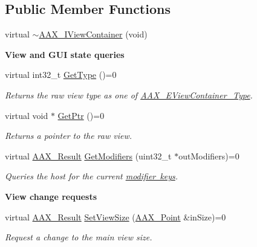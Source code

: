 \subsection*{Public Member Functions}
\begin{DoxyCompactItemize}
\item 
virtual \mbox{\hyperlink{a01889_af41d1aaaf56e5f4e949fffc688a04247}{$\sim$\+A\+A\+X\+\_\+\+I\+View\+Container}} (void)
\end{DoxyCompactItemize}
\begin{Indent}\textbf{ View and G\+UI state queries}\par
\begin{DoxyCompactItemize}
\item 
virtual int32\+\_\+t \mbox{\hyperlink{a01889_a1715c042ed8412a2135f4d9e5109e8fb}{Get\+Type}} ()=0
\begin{DoxyCompactList}\small\item\em Returns the raw view type as one of \mbox{\hyperlink{a00503_ab4c36de253fc80b541eb51074c64caef}{A\+A\+X\+\_\+\+E\+View\+Container\+\_\+\+Type}}. \end{DoxyCompactList}\item 
virtual void $\ast$ \mbox{\hyperlink{a01889_adfde8f90c9a29b83dc80042cf9c3f749}{Get\+Ptr}} ()=0
\begin{DoxyCompactList}\small\item\em Returns a pointer to the raw view. \end{DoxyCompactList}\item 
virtual \mbox{\hyperlink{a00392_a4d8f69a697df7f70c3a8e9b8ee130d2f}{A\+A\+X\+\_\+\+Result}} \mbox{\hyperlink{a01889_ac2fe16f6d81a8d941e36242d9f9d0980}{Get\+Modifiers}} (uint32\+\_\+t $\ast$out\+Modifiers)=0
\begin{DoxyCompactList}\small\item\em Queries the host for the current \mbox{\hyperlink{a00491_a47756e0a56d00468b7045eb26500cb78}{modifier keys}}. \end{DoxyCompactList}\end{DoxyCompactItemize}
\end{Indent}
\begin{Indent}\textbf{ View change requests}\par
\begin{DoxyCompactItemize}
\item 
virtual \mbox{\hyperlink{a00392_a4d8f69a697df7f70c3a8e9b8ee130d2f}{A\+A\+X\+\_\+\+Result}} \mbox{\hyperlink{a01889_ad750e9f0231c61ab32114276ee8cb5f7}{Set\+View\+Size}} (\mbox{\hyperlink{a01609}{A\+A\+X\+\_\+\+Point}} \&in\+Size)=0
\begin{DoxyCompactList}\small\item\em Request a change to the main view size. \end{DoxyCompactList}\end{DoxyCompactItemize}
\end{Indent}
